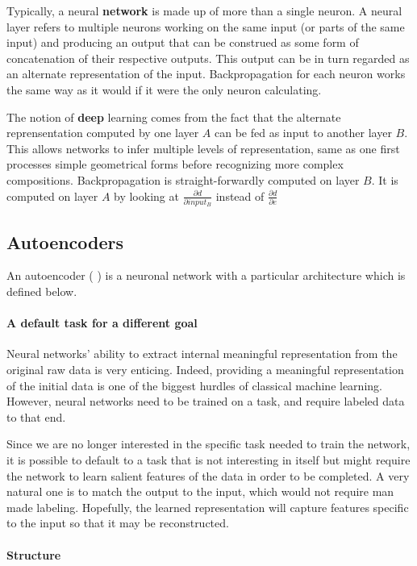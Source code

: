\documentclass[conference]{IEEEtran}
\begin{document}
Typically, a neural \textbf{network} is made up of more than a single neuron. A
neural layer refers to multiple neurons working on the same input (or parts of
the same input) and producing an output that can be construed as some form of
concatenation of their respective outputs. This output can be in turn regarded
as an alternate representation of the input. Backpropagation for each neuron
works the same way as it would if it were the only neuron calculating.

The notion of \textbf{deep} learning comes from the fact that the alternate
reprensentation computed by one layer $A$ can be fed as input to another layer $B$.
This allows networks to infer multiple levels of representation, same as one
first processes simple geometrical forms before recognizing more complex
compositions. Backpropagation is straight-forwardly computed on layer $B$. It is
computed on layer $A$ by looking at $\frac{\partial d}{\partial input_B}$
instead of $\frac{\partial d}{\partial e}$
\subsection{Autoencoders}

An autoencoder (\cite{Hinton504}
) is a neuronal network with a particular architecture which is defined below.

\paragraph{A default task for a different goal}

Neural networks' ability to extract internal meaningful representation from the
original raw data is very enticing. Indeed, providing a meaningful
representation of the initial data is one of the biggest hurdles of classical
machine learning. However, neural networks need to be trained on a task, and
require labeled data to that end. 

Since we are no longer interested in the specific task needed to train the
network, it is possible to default to a task that is not interesting in itself
but might require the network to learn salient features of the data in order to
be completed. A very natural one is to match the output to the input, which
would not require man made labeling. Hopefully, the learned representation will
capture features specific to the input so that it may be reconstructed.

\paragraph{Structure}
\end{document}
